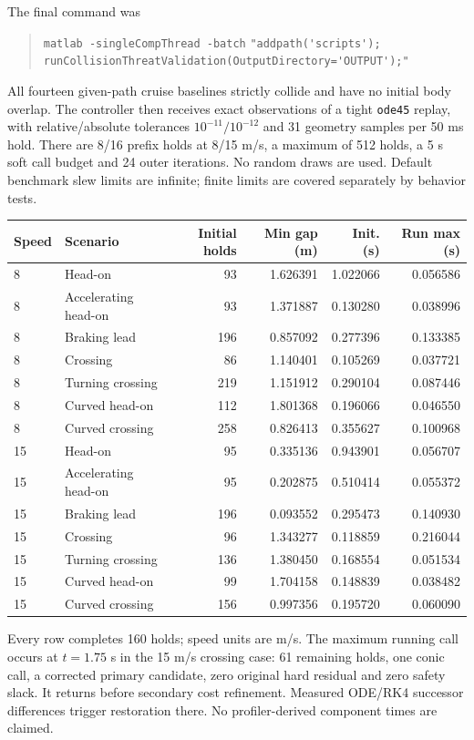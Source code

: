 \documentclass[11pt]{article}
\begin{document}
The final command was
\begin{quote}\small
\verb|matlab -singleCompThread -batch|\newline
\verb|"addpath('scripts'); runCollisionThreatValidation(OutputDirectory='OUTPUT');"|
\end{quote}
All fourteen given-path cruise baselines strictly collide and have no initial
body overlap. The controller then receives exact observations of a tight
\texttt{ode45} replay, with relative/absolute tolerances $10^{-11}/10^{-12}$
and 31 geometry samples per 50 ms hold. There are 8/16 prefix holds at
8/15 m/s, a maximum of 512 holds, a 5 s soft call budget and 24 outer
iterations. No random draws are used. Default benchmark slew limits are
infinite; finite limits are covered separately by behavior tests.

\begin{center}\small
\begin{tabular}{llrrrr}
\toprule
Speed & Scenario & Initial holds & Min gap (m) & Init. (s) & Run max (s)\\
\midrule
8 & Head-on & 93 & 1.626391 & 1.022066 & 0.056586\\
8 & Accelerating head-on & 93 & 1.371887 & 0.130280 & 0.038996\\
8 & Braking lead & 196 & 0.857092 & 0.277396 & 0.133385\\
8 & Crossing & 86 & 1.140401 & 0.105269 & 0.037721\\
8 & Turning crossing & 219 & 1.151912 & 0.290104 & 0.087446\\
8 & Curved head-on & 112 & 1.801368 & 0.196066 & 0.046550\\
8 & Curved crossing & 258 & 0.826413 & 0.355627 & 0.100968\\
15 & Head-on & 95 & 0.335136 & 0.943901 & 0.056707\\
15 & Accelerating head-on & 95 & 0.202875 & 0.510414 & 0.055372\\
15 & Braking lead & 196 & 0.093552 & 0.295473 & 0.140930\\
15 & Crossing & 96 & 1.343277 & 0.118859 & 0.216044\\
15 & Turning crossing & 136 & 1.380450 & 0.168554 & 0.051534\\
15 & Curved head-on & 99 & 1.704158 & 0.148839 & 0.038482\\
15 & Curved crossing & 156 & 0.997356 & 0.195720 & 0.060090\\
\bottomrule
\end{tabular}
\end{center}
Every row completes 160 holds; speed units are m/s. The maximum running call
occurs at $t=1.75$ s in the 15 m/s crossing case: 61 remaining holds, one
conic call, a corrected primary candidate, zero original hard residual and
zero safety slack. It returns before secondary cost refinement. Measured
ODE/RK4 successor differences trigger restoration there. No profiler-derived
component times are claimed.
\end{document}
